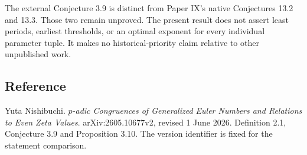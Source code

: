 \documentclass[11pt]{article}
\begin{document}
The external Conjecture 3.9 is distinct from Paper IX's native Conjectures 13.2 and 13.3. Those two remain unproved. The present result does not assert least periods, earliest thresholds, or an optimal exponent for every individual parameter tuple. It makes no historical-priority claim relative to other unpublished work.

\subsection*{Reference}
Yuta Nishibuchi. \emph{$p$-adic Congruences of Generalized Euler Numbers and Relations to Even Zeta Values}. arXiv:2605.10677v2, revised 1 June 2026. Definition 2.1, Conjecture 3.9 and Proposition 3.10. The version identifier is fixed for the statement comparison.
\end{document}
